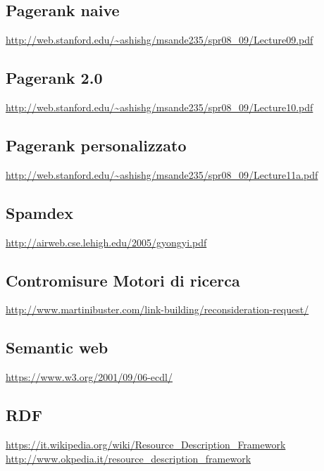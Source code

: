 \subsection*{Pagerank naive}
\url{http://web.stanford.edu/~ashishg/msande235/spr08_09/Lecture09.pdf}

\subsection*{Pagerank 2.0}
\url{http://web.stanford.edu/~ashishg/msande235/spr08_09/Lecture10.pdf}

\subsection*{Pagerank personalizzato}
\url{http://web.stanford.edu/~ashishg/msande235/spr08_09/Lecture11a.pdf}

\subsection*{Spamdex}
\url{http://airweb.cse.lehigh.edu/2005/gyongyi.pdf}

\subsection*{Contromisure Motori di ricerca}
\url{http://www.martinibuster.com/link-building/reconsideration-request/}

\subsection*{Semantic web}
\url{https://www.w3.org/2001/09/06-ecdl/}

\subsection*{RDF}
\url{https://it.wikipedia.org/wiki/Resource_Description_Framework} \\
\url{http://www.okpedia.it/resource_description_framework}